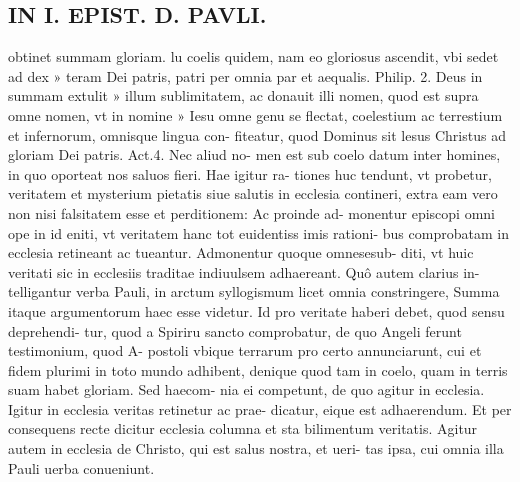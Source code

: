 \documentclass{article}
\begin{document}
\begin{pages}
\section*{IN I. EPIST. D. PAVLI. }
\marginpar{[ p.90 ]}\pstart obtinet summam gloriam. lu coelis quidem, nam eo gloriosus ascendit, vbi sedet ad dex » teram Dei patris, patri per omnia par et aequalis. Philip. 2. Deus in summam extulit » illum sublimitatem, ac donauit illi nomen, quod est supra omne nomen, vt in nomine » Iesu omne genu se flectat, coelestium ac terrestium et infernorum, omnisque lingua con- fiteatur, quod Dominus sit lesus Christus ad gloriam Dei patris. Act.4. Nec aliud no- men est sub coelo datum inter homines, in quo oporteat nos saluos fieri. Hae igitur ra- tiones huc tendunt, vt probetur, veritatem et mysterium pietatis siue salutis in ecclesia contineri, extra eam vero non nisi falsitatem esse et perditionem: Ac proinde ad- monentur episcopi omni ope in id eniti, vt veritatem hanc tot euidentiss imis rationi- bus comprobatam in ecclesia retineant ac tueantur. Admonentur quoque omnesesub- diti, vt huic veritati sic in ecclesiis traditae indiuulsem adhaereant. Quô autem clarius in- telligantur verba Pauli, in arctum syllogismum licet omnia constringere, Summa itaque  argumentorum haec esse videtur. Id pro veritate haberi debet, quod sensu deprehendi- tur, quod a Spiriru sancto comprobatur, de quo Angeli ferunt testimonium, quod A- postoli vbique terrarum pro certo annunciarunt, cui et fidem plurimi in toto mundo adhibent, denique quod tam in coelo, quam in terris suam habet gloriam. Sed haecom- nia ei competunt, de quo agitur in ecclesia. Igitur in ecclesia veritas retinetur ac prae- dicatur, eique est adhaerendum. Et per consequens recte dicitur ecclesia columna et sta bilimentum veritatis. Agitur autem in ecclesia de Christo, qui est salus nostra, et ueri- tas ipsa, cui omnia illa Pauli uerba conueniunt.  \pend
{}
{}

\end{pages}
\end{document}
